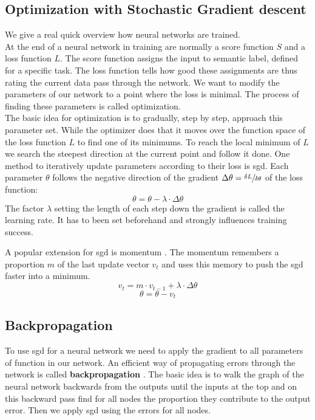 \subsection{Optimization with Stochastic Gradient descent}
\label{sub:concepts:nn:gd}
We give a real quick overview how neural networks are trained.\\
At the end of a neural network in training are normally a score function $S$ and a loss function $L$. The score function assigns the input to semantic label, defined for a specific task. The loss function tells how good these assignments are thus rating the current data pass through the network. We want to modify the parameters of our network to a point where the loss is minimal. The process of finding these parameters is called optimization.\\
The basic idea for optimization is to gradually, step by step, approach this parameter set. While the optimizer does that it moves over the function space of the loss function $L$ to find one of its minimums. To reach the local minimum of $L$ we search the steepest direction at the current point and follow it done. One method to iteratively update parameters according to their loss is \acrfull{sgd}. Each parameter $\theta$ follows the negative direction of the gradient $\Delta\theta = \sfrac{\delta L}{\delta \theta}$ of the loss function:
\begin{equation}
    \theta = \theta - \lambda \cdot \Delta \theta
\end{equation}
The factor $\lambda$ setting the length of each step down the gradient is called the learning rate. It has to been set beforehand and strongly influences training success.

A popular extension for \gls{sgd} is momentum \citep{qian_momentum_1999}. The momentum remembers a proportion $m$ of the last update vector $v_t$ and uses this memory to push the \gls{sgd} faster into a minimum.
\begin{equation}
    v_t = m\cdot v_{t-1} + \lambda \cdot \Delta \theta
\end{equation}
\begin{equation}
    \theta = \theta - v_t
\end{equation}

\subsection{Backpropagation}
\label{sub:concepts:nn:backprob}
To use \gls{sgd} for a neural network we need to apply the gradient to all parameters of function in our network. An efficient way of propagating errors through the network is called \textbf{backpropagation} \citep{rumelhart_learning_1988}. The basic idea is to walk the graph of the neural network backwards from the outputs until the inputs at the top and on this backward pass find for all nodes the proportion they contribute to the output error. Then we apply \gls{sgd} using the errors for all nodes.

